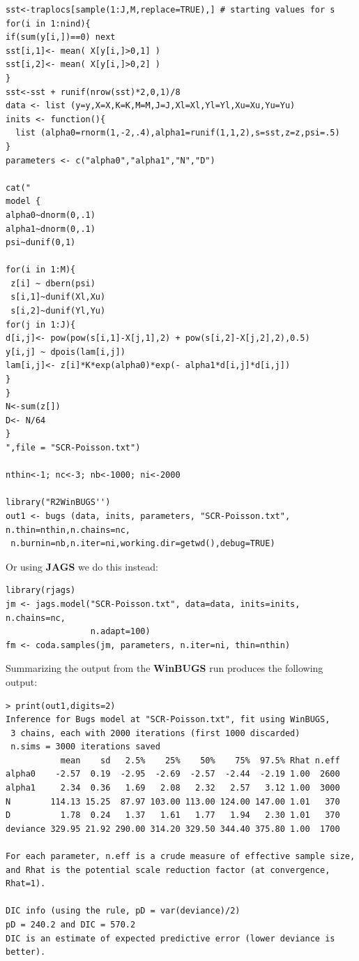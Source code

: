 {\small 
\begin{verbatim}
sst<-traplocs[sample(1:J,M,replace=TRUE),] # starting values for s
for(i in 1:nind){
if(sum(y[i,])==0) next
sst[i,1]<- mean( X[y[i,]>0,1] )
sst[i,2]<- mean( X[y[i,]>0,2] )
}
sst<-sst + runif(nrow(sst)*2,0,1)/8
data <- list (y=y,X=X,K=K,M=M,J=J,Xl=Xl,Yl=Yl,Xu=Xu,Yu=Yu)
inits <- function(){
  list (alpha0=rnorm(1,-2,.4),alpha1=runif(1,1,2),s=sst,z=z,psi=.5)
}
parameters <- c("alpha0","alpha1","N","D")

cat("
model {
alpha0~dnorm(0,.1)
alpha1~dnorm(0,.1)
psi~dunif(0,1)

for(i in 1:M){
 z[i] ~ dbern(psi)
 s[i,1]~dunif(Xl,Xu)
 s[i,2]~dunif(Yl,Yu) 
for(j in 1:J){
d[i,j]<- pow(pow(s[i,1]-X[j,1],2) + pow(s[i,2]-X[j,2],2),0.5)
y[i,j] ~ dpois(lam[i,j])
lam[i,j]<- z[i]*K*exp(alpha0)*exp(- alpha1*d[i,j]*d[i,j])
}
}
N<-sum(z[])
D<- N/64
}
",file = "SCR-Poisson.txt")

nthin<-1; nc<-3; nb<-1000; ni<-2000

library("R2WinBUGS'')
out1 <- bugs (data, inits, parameters, "SCR-Poisson.txt", n.thin=nthin,n.chains=nc,
 n.burnin=nb,n.iter=ni,working.dir=getwd(),debug=TRUE)
\end{verbatim}
}


Or using {\bf JAGS} we do this instead:
{\small
\begin{verbatim}
library(rjags)
jm <- jags.model("SCR-Poisson.txt", data=data, inits=inits, n.chains=nc,
                 n.adapt=100)
fm <- coda.samples(jm, parameters, n.iter=ni, thin=nthin)
\end{verbatim}
}

Summarizing the output from the {\bf WinBUGS} run produces the following output:

{\small
\begin{verbatim}
> print(out1,digits=2)
Inference for Bugs model at "SCR-Poisson.txt", fit using WinBUGS,
 3 chains, each with 2000 iterations (first 1000 discarded)
 n.sims = 3000 iterations saved
           mean    sd   2.5%    25%    50%    75%  97.5% Rhat n.eff
alpha0    -2.57  0.19  -2.95  -2.69  -2.57  -2.44  -2.19 1.00  2600
alpha1     2.34  0.36   1.69   2.08   2.32   2.57   3.12 1.00  3000
N        114.13 15.25  87.97 103.00 113.00 124.00 147.00 1.01   370
D          1.78  0.24   1.37   1.61   1.77   1.94   2.30 1.01   370
deviance 329.95 21.92 290.00 314.20 329.50 344.40 375.80 1.00  1700

For each parameter, n.eff is a crude measure of effective sample size,
and Rhat is the potential scale reduction factor (at convergence, Rhat=1).

DIC info (using the rule, pD = var(deviance)/2)
pD = 240.2 and DIC = 570.2
DIC is an estimate of expected predictive error (lower deviance is better).
\end{verbatim}
}


